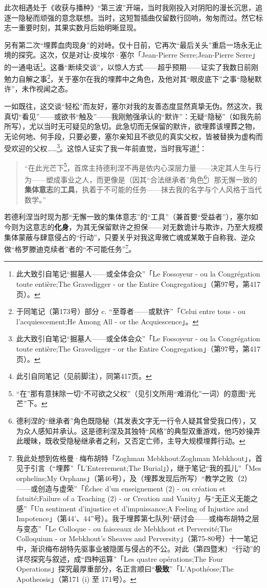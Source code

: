 此次相遇处于《收获与播种》“第三波”开端，当时我刚投入对阴阳的漫长沉思，追逐一隐秘而顽强的意念联想。当时，这短暂插曲仅留数行回响，匆匆而过。然它标志一重要时刻，其果实数月后始明晰显现。

另有第二次“埋葬血肉现身”的对峙。仅十日前，它再次“最后关头”重启一场永无止境的探究。这次，仅是对让-皮埃尔·塞尔「Jean-Pierre Serre;Jean-Pierre Serre」的一通电话\footnote{此大致引自笔记“掘墓人——或全体会众”「Le Fossoyeur - ou la Congrégation toute entière;The Gravedigger - or the Entire Congregation」（第97号，第417页）。}。这番“断续交谈”，以惊人方式——超乎预期——证实了我数日前刚勉力自解之事\footnote{于同笔记（第173号）部分 c. “至尊者——或默许”「Celui entre tous - ou l'acquiescement;He Among All - or the Acquiescence」。}，关于塞尔在我的埋葬中之角色，及他对其“眼皮底下”之事“隐秘默许”，未作视闻之态。

一如既往，这交谈“轻松”而友好，塞尔对我的友善态度显然真挚无伪。然这次，我真切“看见”——或欲书“触及”——我刚勉强承认的“默许”：无疑“隐秘”（如我先前所写），尤以当时无可疑见的急切。此急切而无保留的默许，欲埋葬该埋葬之物，无论何地、何手段，只要必要，塞尔亲知且不欲见的真实父权，皆被替换为虚构而受欢迎的父权……\footnote{此大致引自笔记“掘墓人——或全体会众”「Le Fossoyeur - ou la Congrégation toute entière;The Gravedigger - or the Entire Congregation」（第97号，第417页）。}。这惊人证实了我一年前直觉，当时我写道\footnote{此引自同笔记（见前脚注），同第417页。}：

\begin{quote}
    “在此光芒下\footnote{“在”那有意抹除一切“不可欲之父权”（见引文所用“难消化”一词）的意图“光芒”下。}，首席主持德利涅不再是依内心深层力量——决定其人生与行为——塑成事业之人，而更像是（因其“合法继承者”角色\footnote{德利涅的“继承者”角色既隐秘（其发表文字无一行令人疑其曾受我口传），又为众人感知并承认。这是德利涅及其独特“风格”的典型双重游戏，他巧妙操弄此暧昧，既收受隐秘继承者之利，又否定亡师，主导大规模埋葬行动。}）那无懈一致的\textbf{集体意志}的\textbf{工具}，执着于不可能的任务——抹去我的名字与个人风格于当代数学。”
\end{quote}

若德利涅当时现为那“无懈一致的集体意志”的“工具”（兼首要“受益者”），塞尔如今则为这意志的\textbf{化身}，为其无保留默许之担保——对无数诡计与欺诈，乃至大规模集体蒙蔽与肆意侵占的“行动”，只要关乎对我这卑微亡魂或某敢于自称我、逆众做“格罗滕迪克续者”者的“不可能任务”\footnote{我此处想到佐格曼·梅布胡特「Zoghman Mebkhout;Zoghman Mebkhout」，首见于引言（“埋葬”「L'Enterrement;The Burial」），继于笔记“我的孤儿”「Mes orphelins;My Orphans」（第46号），及（埋葬发现后所写）“教学之败（2）——或创造与虚荣”「Échec d'un enseignement (2) - ou création et fatuité;Failure of a Teaching (2) - or Creation and Vanity」与“无正义无能之感”「Un sentiment d'injustice et d'impuissance;A Feeling of Injustice and Impotence」（第44'、44''号）。我于埋葬第七队列“研讨会——或梅布胡特之层与变态”「Le Colloque - ou faisceaux de Mebkhout et Perversité;The Colloquium - or Mebkhout’s Sheaves and Perversity」（第75-80号）十一笔记中，渐识梅布胡特先驱事业被隐匿与侵占的不公。对此（第四暨末）“行动”的详尽探究与叙述，成“四种运算”「Les quatre opérations;The Four Operations」探究最厚重部分，名正言顺曰“\textbf{极致}”「L'Apothéose;The Apotheosis」（第171 (i) 至 171号）。}。

